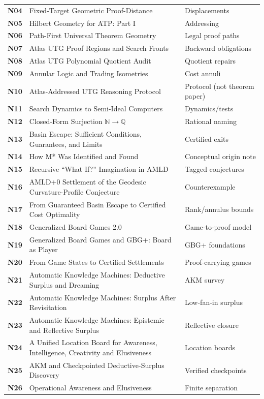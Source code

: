 \documentclass[11pt,letterpaper,oneside]{article}
\begin{document}
\begin{longtable}{@{}>{\color{deepsea}\bfseries}p{.51in}p{4.4in}p{1.35in}@{}}
N04 & Fixed-Target Geometric Proof-Distance & Displacements\\
N05 & Hilbert Geometry for ATP: Part I & Addressing\\
N06 & Path-First Universal Theorem Geometry & Legal proof paths\\
N07 & Atlas UTG Proof Regions and Search Fronts & Backward obligations\\
N08 & Atlas UTG Polynomial Quotient Audit & Quotient repairs\\
N09 & Annular Logic and Trading Isometries & Cost annuli\\
N10 & Atlas-Addressed UTG Reasoning Protocol & Protocol (not theorem paper)\\
N11 & Search Dynamics to Semi-Ideal Computers & Dynamics/tests\\
N12 & Closed-Form Surjection $\mathbb N\to\mathbb Q$ & Rational naming\\
N13 & Basin Escape: Sufficient Conditions, Guarantees, and Limits & Certified exits\\
N14 & How M* Was Identified and Found & Conceptual origin note\\
N15 & Recursive ``What If?'' Imagination in AMLD & Tagged conjectures\\
N16 & AMLD+0 Settlement of the Geodesic Curvature-Profile Conjecture & Counterexample\\\midrule
N17 & From Guaranteed Basin Escape to Certified Cost Optimality & Rank/annulus bounds\\
N18 & Generalized Board Games 2.0 & Game-to-proof model\\
N19 & Generalized Board Games and GBG+: Board as Player & GBG+ foundations\\
N20 & From Game States to Certified Settlements & Proof-carrying games\\
N21 & Automatic Knowledge Machines: Deductive Surplus and Dreaming & AKM survey\\
N22 & Automatic Knowledge Machines: Surplus After Revisitation & Low-fan-in surplus\\
N23 & Automatic Knowledge Machines: Epistemic and Reflective Surplus & Reflective closure\\
N24 & A Unified Location Board for Awareness, Intelligence, Creativity and Elusiveness & Location boards\\
N25 & AKM and Checkpointed Deductive-Surplus Discovery & Verified checkpoints\\
N26 & Operational Awareness and Elusiveness & Finite separation\\

\end{longtable}
\end{document}
